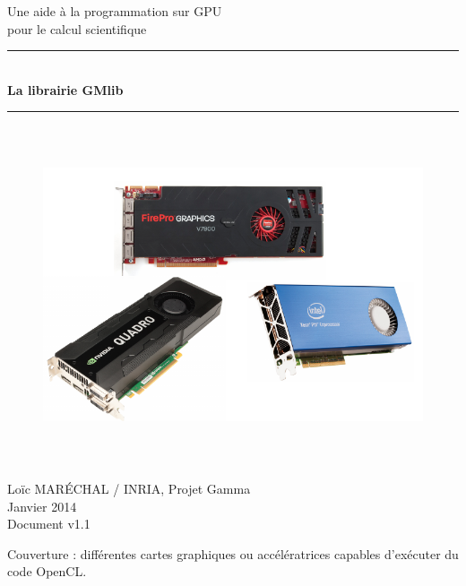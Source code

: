 \documentclass[a4paper,12pt]{article}
\newcommand{\HRule}{\rule{\linewidth}{1mm}}
\begin{document}
%
%

\begin{titlepage}

\begin{center}
\huge Une aide à la programmation sur GPU\\ pour le calcul scientifique
\HRule \\
\medskip
{\Huge \bfseries La librairie GMlib} \\
\HRule
\end{center}


\begin{figure}[htbp]
\begin{center}
\includegraphics[height=10cm]{gpu.pdf}
\end{center}
\end{figure}


\begin{flushright}
\Large Lo\"ic MAR\'ECHAL / INRIA, Projet Gamma\\
\Large Janvier 2014 \\
\normalsize Document v1.1
\end{flushright}

\end{titlepage}

\clearpage

\setcounter{tocdepth}{2}
\tableofcontents
\vfill

\footnotesize{Couverture : différentes cartes graphiques ou accélératrices capables d'exécuter du code OpenCL.}
\normalsize
\end{document}
